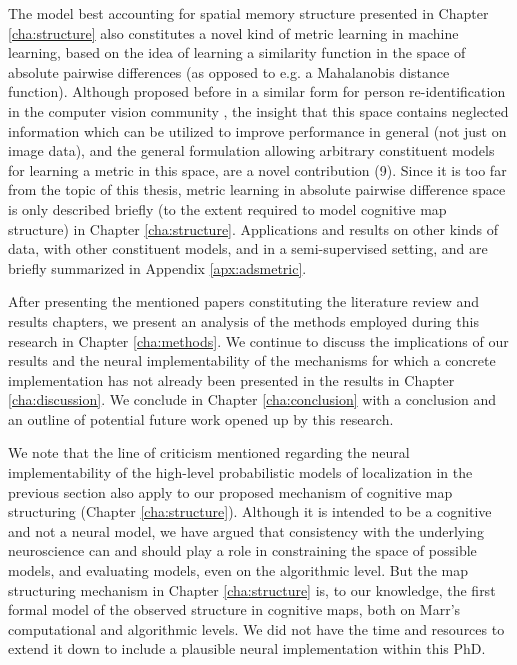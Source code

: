 The model best accounting for spatial memory structure presented in Chapter \ref{cha:structure} also constitutes a novel kind of metric learning in machine learning, based on the idea of learning a similarity function in the space of absolute pairwise differences (as opposed to e.g. a Mahalanobis distance function). Although proposed before in a similar form for person re-identification in the computer vision community \citep{zheng2011person}, the insight that this space contains neglected information which can be utilized to improve performance in general (not just on image data), and the general formulation allowing arbitrary constituent models for learning a metric in this space, are a novel contribution (9). Since it is too far from the topic of this thesis, metric learning in absolute pairwise difference space is only described briefly (to the extent required to model cognitive map structure) in Chapter \ref{cha:structure}. Applications and results on other kinds of data, with other constituent models, and in a semi-supervised setting, and are briefly summarized in Appendix \ref{apx:adsmetric}.

After presenting the mentioned papers constituting the literature review and results chapters, we present an analysis of the methods employed during this research in Chapter \ref{cha:methods}. We continue to discuss the implications of our results and the neural implementability of the mechanisms for which a concrete implementation has not already been presented in the results in Chapter \ref{cha:discussion}. We conclude in Chapter \ref{cha:conclusion} with a conclusion and an outline of potential future work opened up by this research. 

We note that the line of criticism mentioned regarding the neural implementability of the high-level probabilistic models of localization in the previous section also apply to our proposed mechanism of cognitive map structuring (Chapter \ref{cha:structure}). Although it is intended to be a cognitive and not a neural model, we have argued that consistency with the underlying neuroscience can and should play a role in constraining the space of possible models, and evaluating models, even on the algorithmic level. But the map structuring mechanism in Chapter \ref{cha:structure} is, to our knowledge, the first formal model of the observed structure in cognitive maps, both on Marr's computational and algorithmic levels. We did not have the time and resources to extend it down to include a plausible neural implementation within this PhD.

